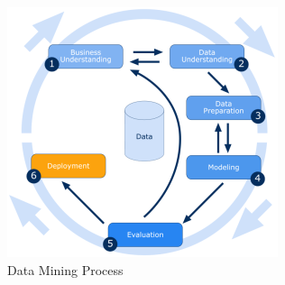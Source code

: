 \begin{figure}[ht!]
	\centering
	\includegraphics[scale=0.9]{Chap1/images/DataMi1}
	\caption{Data Mining Process \cite{kumar2023different}}
	\label{fig:datami}
\end{figure}

